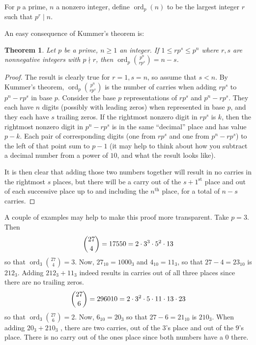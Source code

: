 \documentclass[12pt]{article}
\DeclareMathOperator{\ord}{ord}
\newtheorem{thm}{Theorem}
\begin{document}
For $p$ a prime, $n$ a nonzero integer, define $\ord_p(n)$ to be the largest integer $r$ such that $p^r\mid n$.

An easy consequence of Kummer's theorem is:
\begin{thm} Let $p$ be a prime, $n\geq 1$ an integer. If $1\leq rp^s\leq p^n$ where $r,s$ are nonnegative integers with $p\nmid r$, then $\ord_p\binom{p^n}{rp^s} = n-s$.
\end{thm}

\begin{proof} The result is clearly true for $r=1, s=n$, so assume that $s<n$. By Kummer's theorem, $\ord_p\binom{p^n}{rp^s}$ is the number of carries when adding $rp^s$ to $p^n-rp^s$ in base $p$. Consider the base $p$ representations of $rp^s$ and $p^n-rp^s$. They each have $n$ digits (possibly with leading zeros) when represented in base $p$, and they each have $s$ trailing zeros. If the rightmost nonzero digit in $rp^s$ is $k$, then the rightmost nonzero digit in $p^n-rp^s$ is in the same ``decimal'' place and has value $p-k$. Each pair of corresponding digits (one from $rp^s$ and one from $p^n-rp^s$) to the left of that point sum to $p-1$ (it may help to think about how you subtract a decimal number from a power of $10$, and what the result looks like).

It is then clear that adding those two numbers together will result in no carries in the rightmost $s$ places, but there will be a carry out of the $s+1^{\mathrm{st}}$ place and out of each successive place up to and including the $n^{\mathrm{th}}$ place, for a total of $n-s$ carries.
\end{proof}

A couple of examples may help to make this proof more transparent. Take $p=3$. Then
\[
  \dbinom{27}{4} = 17550 = 2\cdot 3^3 \cdot 5^2\cdot 13
\]
so that $\ord_3 \binom{27}{4}=3$. Now, $27_{10}=1000_3$ and $4_{10}=11_3$, so that $27-4=23_{10}$ is $212_3$. Adding $212_3+11_3$ indeed results in carries out of all three places since there are no trailing zeros.
\[
  \dbinom{27}{6} = 296010 = 2\cdot 3^2\cdot 5\cdot 11\cdot 13\cdot 23
\]
so that $\ord_3 \binom{27}{6}=2$. Now, $6_{10}=20_3$ so that $27-6=21_{10}$ is $210_3$. When adding $20_3+210_3$ , there are two carries, out of the $3$'s place and out of the $9$'s place. There is no carry out of the ones place since both numbers have a $0$ there.

\end{document}
